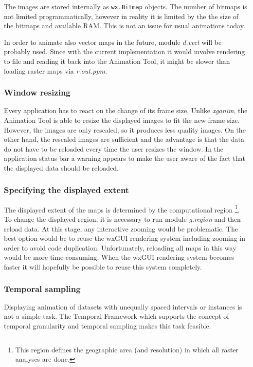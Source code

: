 \documentclass[a4paper,12pt,oneside]{book}
\newcommand{\module}[1]{\textsl{#1}}
\newcommand{\tf}{Temporal Framework\xspace}
\newcommand{\at}{Animation Tool\xspace}
\begin{document}
The images are stored internally as \verb|wx.Bitmap| \cite{wxPythonDoc} objects.
The number of bitmaps is not limited programmatically,
however in reality it is limited by the the size of the bitmaps and available RAM.
This is not an issue for usual animations today.

In order to animate also vector maps in the future, module \module{d.vect} will be probably
used. Since with the current implementation it would involve rendering to file and reading it back
into the \at, it might be slower than loading raster maps via \module{r.out.ppm}.

\subsubsection{Window resizing}
Every application has to react on the change of its frame size.
Unlike \module{xganim}, the \at is able to resize the displayed images to fit the new frame size.
However, the images are only rescaled, so it produces less quality images.
On the other hand, the rescaled images are sufficient and the advantage is that
the data do not have to be reloaded every time the user resizes the window.
In the application status bar a warning appears to make the user aware of the fact
that the displayed data should be reloaded.

\subsubsection{Specifying the displayed extent}
The displayed extent of the maps is determined by the computational region%
\footnote{This region defines the geographic area (and resolution) in which all raster analyses are done.}.
To change the displayed region, it is necessary to run module \module{g.region} and then reload data.
At this stage, any interactive zooming would be problematic.
The best option would be to reuse the wxGUI rendering system including zooming in order to avoid code duplication.
Unfortunately, reloading all maps in this way would be more time-consuming.
When the wxGUI rendering system becomes faster
it will hopefully be  possible to reuse this system completely.


\subsubsection{Temporal sampling}
Displaying animation of datasets with unequally spaced intervals or instances is not a simple task.
The \tf which supports the concept of temporal granularity and temporal sampling makes this task feasible.
\end{document}
